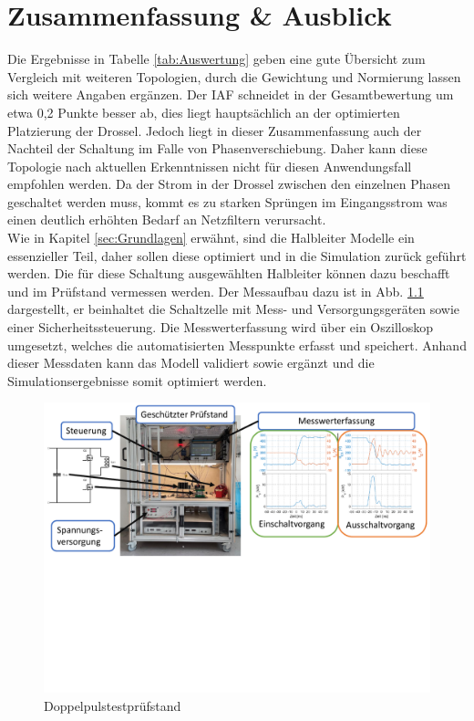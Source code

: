 \chapter{Zusammenfassung \& Ausblick}
Die Ergebnisse in Tabelle \ref{tab:Auswertung} geben eine gute Übersicht zum Vergleich mit weiteren Topologien, durch die Gewichtung und Normierung lassen sich weitere Angaben ergänzen. Der \gls{IAF} schneidet in der Gesamtbewertung um etwa 0,2 Punkte besser ab, dies liegt hauptsächlich an der optimierten Platzierung der Drossel. Jedoch liegt in dieser Zusammenfassung auch der Nachteil der Schaltung im Falle von Phasenverschiebung. Daher kann diese Topologie nach aktuellen Erkenntnissen nicht für diesen Anwendungsfall empfohlen werden. Da der Strom in der Drossel zwischen den einzelnen Phasen geschaltet werden muss, kommt es zu starken Sprüngen im Eingangsstrom was einen deutlich erhöhten Bedarf an Netzfiltern verursacht. \\ 
Wie in Kapitel \ref{sec:Grundlagen} erwähnt, sind die Halbleiter Modelle ein essenzieller Teil, daher sollen diese optimiert und in die Simulation zurück geführt werden. Die für diese Schaltung ausgewählten Halbleiter können dazu beschafft und im Prüfstand vermessen werden. Der Messaufbau dazu ist in Abb. \ref{fig:dpt} dargestellt, er beinhaltet die Schaltzelle mit Mess- und Versorgungsgeräten sowie einer Sicherheitssteuerung. Die Messwerterfassung wird über ein Oszilloskop umgesetzt, welches die automatisierten Messpunkte erfasst und speichert.  Anhand dieser Messdaten kann das Modell validiert sowie ergänzt und die Simulationsergebnisse somit optimiert werden. \\
\begin{figure}
	\centering
	\includegraphics[width=0.95\linewidth]{content/Grafiken/DPT}
	\caption[Doppelpulstestprüfstand]{Doppelpulstestprüfstand}
	\label{fig:dpt}
\end{figure}

